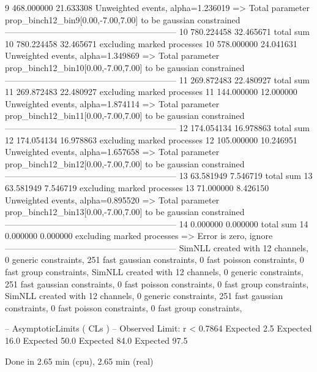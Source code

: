 9          468.000000      21.633308       Unweighted events, alpha=1.236019
  => Total parameter prop_binch12_bin9[0.00,-7.00,7.00] to be gaussian constrained
------------------------------------------------------------
10         780.224458      32.465671       total sum                     
10         780.224458      32.465671       excluding marked processes    
10         578.000000      24.041631       Unweighted events, alpha=1.349869
  => Total parameter prop_binch12_bin10[0.00,-7.00,7.00] to be gaussian constrained
------------------------------------------------------------
11         269.872483      22.480927       total sum                     
11         269.872483      22.480927       excluding marked processes    
11         144.000000      12.000000       Unweighted events, alpha=1.874114
  => Total parameter prop_binch12_bin11[0.00,-7.00,7.00] to be gaussian constrained
------------------------------------------------------------
12         174.054134      16.978863       total sum                     
12         174.054134      16.978863       excluding marked processes    
12         105.000000      10.246951       Unweighted events, alpha=1.657658
  => Total parameter prop_binch12_bin12[0.00,-7.00,7.00] to be gaussian constrained
------------------------------------------------------------
13         63.581949       7.546719        total sum                     
13         63.581949       7.546719        excluding marked processes    
13         71.000000       8.426150        Unweighted events, alpha=0.895520
  => Total parameter prop_binch12_bin13[0.00,-7.00,7.00] to be gaussian constrained
------------------------------------------------------------
14         0.000000        0.000000        total sum                     
14         0.000000        0.000000        excluding marked processes    
  => Error is zero, ignore      
------------------------------------------------------------
SimNLL created with 12 channels, 0 generic constraints, 251 fast gaussian constraints, 0 fast poisson constraints, 0 fast group constraints, 
SimNLL created with 12 channels, 0 generic constraints, 251 fast gaussian constraints, 0 fast poisson constraints, 0 fast group constraints, 
SimNLL created with 12 channels, 0 generic constraints, 251 fast gaussian constraints, 0 fast poisson constraints, 0 fast group constraints, 

 -- AsymptoticLimits ( CLs ) --
Observed Limit: r < 0.7864
Expected  2.5%
Expected 16.0%
Expected 50.0%
Expected 84.0%
Expected 97.5%

Done in 2.65 min (cpu), 2.65 min (real)
